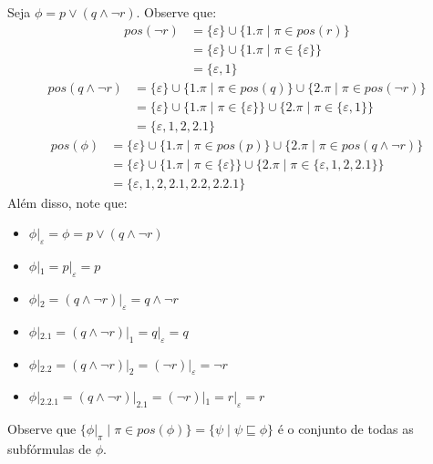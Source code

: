 \begin{example}
    Seja $\phi = p \vee (q \wedge \neg r)$. Observe que:
    \begin{equation*}
        \begin{split}
            pos(\neg r) & = \{\varepsilon\} \cup \{1.\pi \mid \pi \in pos(r)\} \\
                        & = \{\varepsilon\} \cup \{1.\pi \mid \pi \in \{\varepsilon\}\} \\
                        & = \{\varepsilon,1\}
        \end{split}
    \end{equation*}
    \begin{equation*}
        \begin{split}
            pos(q \wedge \neg r) & = \{\varepsilon\} \cup \{1.\pi \mid \pi \in pos(q)\} \cup \{2.\pi \mid \pi \in pos(\neg r)\} \\
                                 & = \{\varepsilon\} \cup \{1.\pi \mid \pi \in \{\varepsilon\}\} \cup \{2.\pi \mid \pi \in \{\varepsilon,1\}\} \\
                                 & = \{\varepsilon,1,2,2.1\}
        \end{split}
    \end{equation*}
    \begin{equation*}
        \begin{split}
            pos(\phi) & = \{\varepsilon\} \cup \{1.\pi \mid \pi \in pos(p)\} \cup \{2.\pi \mid \pi \in pos(q \wedge \neg r)\} \\
                      & = \{\varepsilon\} \cup \{1.\pi \mid \pi \in \{\varepsilon\}\} \cup \{2.\pi \mid \pi \in \{\varepsilon,1,2,2.1\}\} \\
                      & = \{\varepsilon,1,2,2.1,2.2,2.2.1\}
        \end{split}
    \end{equation*}
    Além disso, note que:
    \begin{itemize}
        \item $\phi|_{\varepsilon} = \phi = p \vee (q \wedge \neg r)$
        \item $\phi|_{1} = p|_{\varepsilon} = p$
        \item $\phi|_{2} = (q \wedge \neg r)|_{\varepsilon} = q \wedge \neg r$
        \item $\phi|_{2.1} = (q \wedge \neg r)|_{1} = q|_{\varepsilon} = q$
        \item $\phi|_{2.2} = (q \wedge \neg r)|_{2} = (\neg r)|_{\varepsilon} = \neg r$
        \item $\phi|_{2.2.1} = (q \wedge \neg r)|_{2.1} = (\neg r)|_{1} = r|_{\varepsilon} = r$
    \end{itemize}
    Observe que $\{\phi|_\pi \mid \pi \in pos(\phi)\} = \{\psi \mid \psi \sqsubseteq \phi\}$ é o conjunto de todas as subfórmulas de $\phi$.
\end{example}


